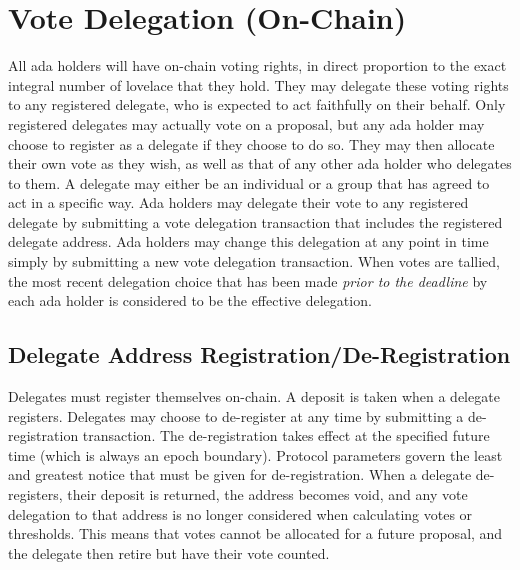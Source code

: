 \newpage
\section{Vote Delegation (On-Chain)}
\label{sect:delegation}

All ada holders will have on-chain voting rights, in direct proportion to the exact integral number of lovelace that they hold.
They may delegate these voting rights to any registered delegate, who is expected to act faithfully on their behalf.
Only registered delegates may actually vote on a proposal, but any ada holder may choose to register as a delegate if they choose to do so.
They may then allocate their own vote as they wish, as well as that of any other ada holder who delegates to them.
A delegate may either be an individual or a group that has agreed to act in a specific way.
Ada holders may delegate their
vote to any registered delegate by submitting a vote delegation transaction that includes the registered delegate address.
Ada holders may change this delegation at any point in time simply by submitting a new vote delegation transaction.  When votes are tallied, the most recent delegation choice that has been made \emph{prior to the deadline} by each ada holder is considered to be the effective delegation.

\subsection{Delegate Address Registration/De-Registration}
\label{sect:registration}

Delegates must register themselves on-chain.
A deposit is taken when a delegate registers.  Delegates may choose to de-register at any time by submitting a de-registration transaction.  The de-registration takes effect
at the specified future time (which is always an epoch boundary).  Protocol parameters govern the least and greatest notice that must be given for de-registration.  When a delegate de-registers, their deposit is returned,
the address becomes void, and any vote delegation to that address is no longer considered when calculating votes or thresholds.  This means that votes cannot be allocated for a future proposal, and the delegate then
retire but have their vote counted.

